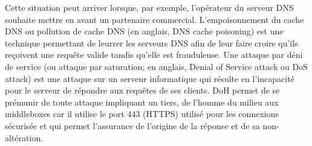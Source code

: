 \documentclass[a4paper,12pt]{article}
\begin{document}
	Cette situation peut arriver lorsque, par exemple, l'opérateur du serveur DNS souhaite mettre en avant un partenaire commercial.
	L'empoisonnement du cache DNS ou pollution de cache DNS (en anglais, DNS cache poisoning) est une technique permettant de leurrer les serveurs DNS afin de leur faire croire qu'ils reçoivent une requête valide tandis qu'elle est frauduleuse.
	Une attaque par déni de service (ou attaque par saturation; en anglais, Denial of Service attack ou DoS attack) est une attaque sur un serveur informatique qui résulte en l'incapacité pour le serveur de répondre aux requêtes de ses clients.
	DoH permet de se prémunir de toute attaque impliquant un tiers, de l’homme du milieu aux middleboxes car il utilise le port 443 (HTTPS) utilisé pour les connexions sécurisée et qui permet l'assurance de l'origine de la réponse et de sa non-altération.
	
\end{document}
